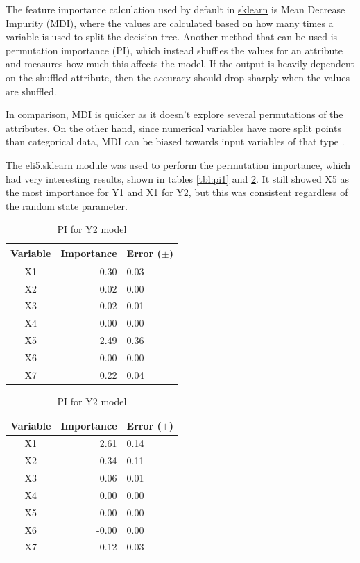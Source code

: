 \documentclass[12pt]{article}
\begin{document}
The feature importance calculation used by default in \url{sklearn} is Mean Decrease Impurity (MDI), where the values are calculated based on how many times a variable is used to split the decision tree. Another method that can be used is permutation importance (PI), which instead shuffles the values for an attribute and measures how much this affects the model. If the output is heavily dependent on the shuffled attribute, then the accuracy should drop sharply when the values are shuffled.

In comparison, MDI is quicker as it doesn't explore several permutations of the attributes. On the other hand, since numerical variables have more split points than categorical data, MDI can be biased towards input variables of that type \cite{aiimportance}.

The \url{eli5.sklearn} module was used to perform the permutation importance, which had very interesting results, shown in tables \ref{tbl:pi1} and \ref{tbl:pi2}. It still showed X5 as the most importance for Y1 and X1 for Y2, but this was consistent regardless of the random state parameter.

\begin{table}[!htb]
    \begin{minipage}{.5\linewidth}
      \caption{PI for Y1 model}   
      \label{tbl:pi1}
      \centering
\begin{tabular}{||c|r|l||}
\hline
Variable    		& Importance & Error ($\pm$) \\
\hline
X1 & 0.30  & 0.03  \\
X2 & 0.02  & 0.00  \\
X3 & 0.02  & 0.01  \\
X4 & 0.00  & 0.00  \\
X5 & 2.49  & 0.36  \\
X6 &-0.00  & 0.00  \\
X7 & 0.22  & 0.04  \\
\hline
\end{tabular}
    \end{minipage}%
    \begin{minipage}{.5\linewidth}
      \centering
        \caption{PI for Y2 model}
              \label{tbl:pi2}
\begin{tabular}{||c|r|l||}
\hline
Variable    		& Importance & Error ($\pm$) \\
\hline
X1                   & 2.61 & 0.14   \\
X2                   & 0.34 & 0.11  \\
X3                   & 0.06 & 0.01 \\
X4                   & 0.00 & 0.00  \\
X5                   & 0.00 & 0.00  \\
X6                   &-0.00 & 0.00  \\
X7                   & 0.12 & 0.03   \\
\hline
\end{tabular}
    \end{minipage} 
\end{table}
\end{document}
